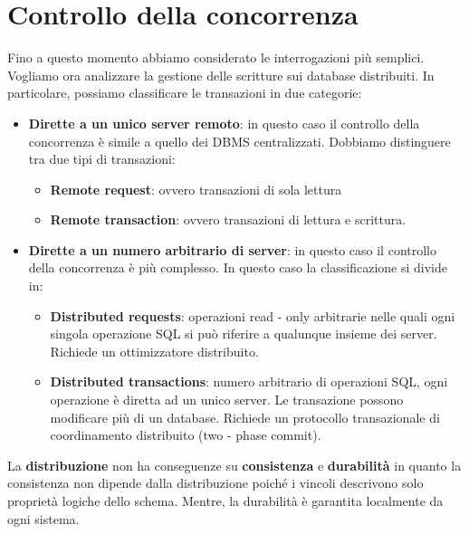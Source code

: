 \section{Controllo della concorrenza}
Fino a questo momento abbiamo considerato le interrogazioni più semplici. Vogliamo
ora analizzare la gestione delle scritture sui database distribuiti. In particolare,
possiamo classificare le transazioni in due categorie:
\begin{itemize}
      \item \textbf{Dirette a un unico server remoto}: in questo caso il controllo
            della concorrenza è simile a quello dei DBMS centralizzati. Dobbiamo
            distinguere tra due tipi di transazioni:
            \begin{itemize}
                  \item \textbf{Remote request}: ovvero transazioni di sola lettura
                  \item \textbf{Remote transaction}: ovvero transazioni di lettura
                        e scrittura.
            \end{itemize}
      \item \textbf{Dirette a un numero arbitrario di server}: in questo caso il
            controllo della concorrenza è più complesso. In questo caso la
            classificazione si divide in:
            \begin{itemize}
                  \item \textbf{Distributed requests}: operazioni read - only
                        arbitrarie nelle quali ogni singola operazione SQL si può
                        riferire a qualunque insieme dei server. Richiede un
                        ottimizzatore distribuito.
                  \item \textbf{Distributed transactions}: numero arbitrario di
                        operazioni SQL, ogni operazione è diretta ad un unico
                        server. Le transazione possono modificare più di un
                        database. Richiede un protocollo transazionale di
                        coordinamento distribuito (two - phase commit).
            \end{itemize}
\end{itemize}
La \textbf{distribuzione} non ha conseguenze su \textbf{consistenza} e \textbf{durabilità}
in quanto la consistenza non dipende dalla distribuzione poiché i vincoli descrivono
solo proprietà logiche dello schema. Mentre, la durabilità è garantita localmente
da ogni sistema.

